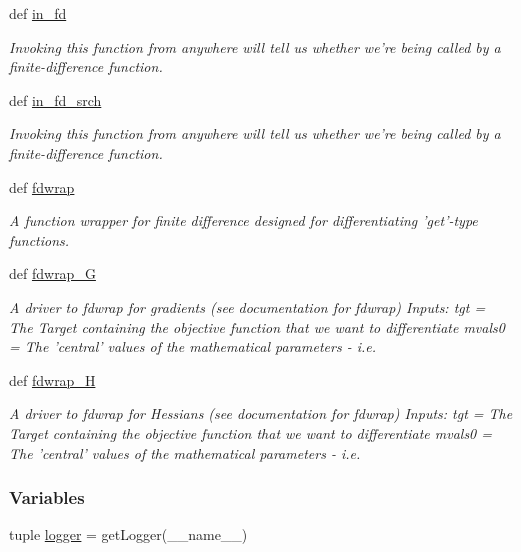 \begin{DoxyCompactItemize}
def \hyperlink{namespaceforcebalance_1_1finite__difference_ad84d3e385db1190e7d8ef58bc08a6c52}{in\-\_\-fd}
\begin{DoxyCompactList}\small\item\em Invoking this function from anywhere will tell us whether we're being called by a finite-\/difference function. \end{DoxyCompactList}\item 
def \hyperlink{namespaceforcebalance_1_1finite__difference_a978c262bfab74a29143808b7562ab61b}{in\-\_\-fd\-\_\-srch}
\begin{DoxyCompactList}\small\item\em Invoking this function from anywhere will tell us whether we're being called by a finite-\/difference function. \end{DoxyCompactList}\item 
def \hyperlink{namespaceforcebalance_1_1finite__difference_ae484c591ae8c4e5bae73a0ef2660c339}{fdwrap}
\begin{DoxyCompactList}\small\item\em A function wrapper for finite difference designed for differentiating 'get'-\/type functions. \end{DoxyCompactList}\item 
def \hyperlink{namespaceforcebalance_1_1finite__difference_a00322fb65860c390616f74d05037c797}{fdwrap\-\_\-\-G}
\begin{DoxyCompactList}\small\item\em A driver to fdwrap for gradients (see documentation for fdwrap) Inputs\-: tgt = The Target containing the objective function that we want to differentiate mvals0 = The 'central' values of the mathematical parameters -\/ i.\-e. \end{DoxyCompactList}\item 
def \hyperlink{namespaceforcebalance_1_1finite__difference_a77a0bc1ae3cbbcc8d38a0ef9ca877d6d}{fdwrap\-\_\-\-H}
\begin{DoxyCompactList}\small\item\em A driver to fdwrap for Hessians (see documentation for fdwrap) Inputs\-: tgt = The Target containing the objective function that we want to differentiate mvals0 = The 'central' values of the mathematical parameters -\/ i.\-e. \end{DoxyCompactList}\end{DoxyCompactItemize}
\subsubsection*{Variables}
\begin{DoxyCompactItemize}
\item 
tuple \hyperlink{namespaceforcebalance_1_1finite__difference_a2bdf74505c45f442e1c96d557414254e}{logger} = get\-Logger(\-\_\-\-\_\-name\-\_\-\-\_\-)
\end{DoxyCompactItemize}


